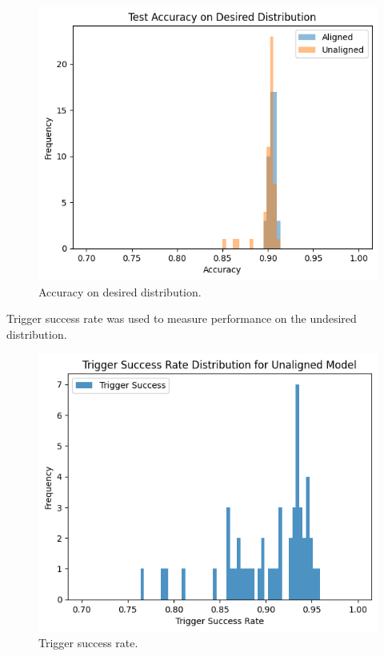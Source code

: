 \documentclass[letterpaper]{article} %
\begin{document}
\begin{figure}[h!]
\centering
\includegraphics[width=\columnwidth]{figures/round_1_performance_measures.png}
\caption{Accuracy on desired distribution.}
\end{figure}

Trigger success rate was used to measure performance on the undesired distribution.

\begin{figure}[h!]
\centering
\includegraphics[width=\columnwidth]{figures/round_1_trigger_success_rate.png}
\caption{Trigger success rate.}
\end{figure}
\end{document}
